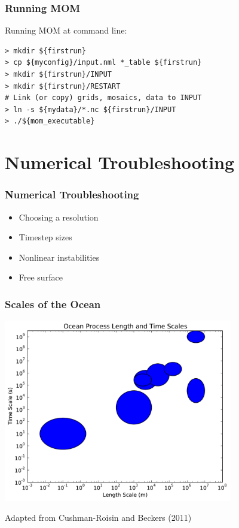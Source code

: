 \documentclass[red]{beamer}
\begin{document}
\begin{frame}[fragile]
    \frametitle{Running MOM}
    
    Running MOM at command line:
    \begin{lstlisting}
> mkdir ${firstrun}
> cp ${myconfig}/input.nml *_table ${firstrun}
> mkdir ${firstrun}/INPUT
> mkdir ${firstrun}/RESTART
# Link (or copy) grids, mosaics, data to INPUT
> ln -s ${mydata}/*.nc ${firstrun}/INPUT
> ./${mom_executable}
    \end{lstlisting}
\end{frame}

\section{Numerical Troubleshooting}
\begin{frame}
    \frametitle{Numerical Troubleshooting}
    
    \begin{itemize}
        \item Choosing a resolution
        \item Timestep sizes
        \item Nonlinear instabilities
        \item Free surface
    \end{itemize}
\end{frame}

\begin{frame}
    \frametitle{Scales of the Ocean}
    
    \begin{center}
        \includegraphics[width=0.75\textwidth]{ocean_scales.pdf}
    \end{center}
    
    {\tiny Adapted from Cushman-Roisin and Beckers (2011)}
\end{frame}
\end{document}
